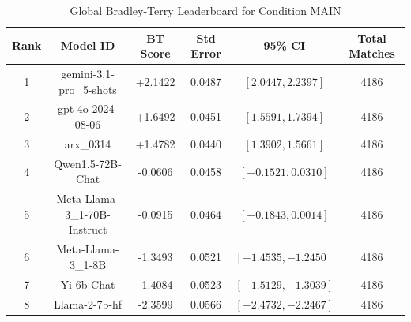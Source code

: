 \begin{table}[ht]
\centering
\caption{Global Bradley-Terry Leaderboard for Condition \textsc{MAIN}}
\label{tab:leaderboard_main}
\begin{tabular}{cccccc}
\hline
\textbf{Rank} & \textbf{Model ID} & \textbf{BT Score} & \textbf{Std Error} & \textbf{95\% CI} & \textbf{Total Matches} \\
\hline
1 & gemini-3.1-pro\_5-shots & +2.1422 & 0.0487 & $[2.0447, 2.2397]$ & 4186 \\
2 & gpt-4o-2024-08-06 & +1.6492 & 0.0451 & $[1.5591, 1.7394]$ & 4186 \\
3 & arx\_0314 & +1.4782 & 0.0440 & $[1.3902, 1.5661]$ & 4186 \\
4 & Qwen1.5-72B-Chat & -0.0606 & 0.0458 & $[-0.1521, 0.0310]$ & 4186 \\
5 & Meta-Llama-3\_1-70B-Instruct & -0.0915 & 0.0464 & $[-0.1843, 0.0014]$ & 4186 \\
6 & Meta-Llama-3\_1-8B & -1.3493 & 0.0521 & $[-1.4535, -1.2450]$ & 4186 \\
7 & Yi-6b-Chat & -1.4084 & 0.0523 & $[-1.5129, -1.3039]$ & 4186 \\
8 & Llama-2-7b-hf & -2.3599 & 0.0566 & $[-2.4732, -2.2467]$ & 4186 \\
\hline
\end{tabular}
\end{table}
